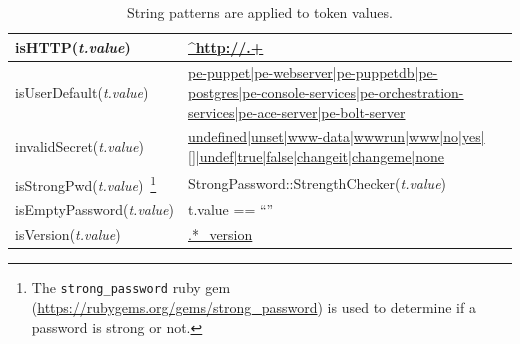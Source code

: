 \begin{table}
\begin{subtable}[h]{\linewidth}
\begin{tabular}{p{3cm}p{5cm}}
          isHTTP(\textit{t.value}) & 
            \url{^http://.+} \\ \midrule
          isUserDefault(\textit{t.value}) & 
            \url{pe-puppet|pe-webserver|pe-puppetdb|pe-postgres|pe-console-services|pe-orchestration-services|pe-ace-server|pe-bolt-server} \\ \midrule
          invalidSecret(\textit{t.value}) & 
            \url{undefined|unset|www-data|wwwrun|www|no|yes|[]|undef|true|false|changeit|changeme|none} \\\midrule
          isStrongPwd(\textit{t.value})~\footnote{The \texttt{strong\_password} ruby gem (\url{https://rubygems.org/gems/strong_password}) is used to determine if a password is strong or not.} & 
            StrongPassword::StrengthChecker(\textit{t.value}) \\\midrule
          isEmptyPassword(\textit{t.value}) & 
            t.value == ``''\\\midrule
          isVersion(\textit{t.value}) & 
            \url{.*_version}\\
        \bottomrule
      \end{tabular}
      \caption{String patterns are applied to token values.}
      \label{tab:string_patterns}
      \end{subtable}

      \par\bigskip


\end{table}
